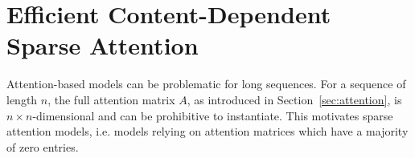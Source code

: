 \documentclass[a4paper]{article}
\begin{document}
\begin{comment}
\section{Sparse Attention as an Integer Programming Problem}
The sparse attention problem with an attention budget of \(k\)
can be formulated as an integer programming problem as follows.
Define the \(n \times n\) matrix \(X\) as \(X_{ij} = 1\) if 
position \(i\) attends to position \(j\) and \(X_{ij} = 0\)
otherwise. Then the sparse attention function can be written as:
\begin{align}
    \operatorname{Attention}(Q_i, K_j, V_j) &= \sum_{j \in [n]} 
    X_{ij} \cdot \left(\frac{\operatorname{exp} Q_i^\top K_j }{
    \sqrt{d}\sum_{i \in [n]} \operatorname{exp} Q_i^\top K_j}\right)V_j. \\
    &= X_i^\top A_i
\end{align}
This defines the full \(n \times n\) 
attention matrix sparsified using \(X\) as 
\(X^\top A\). The final objective function of maximizing log 
likelihood using
the attention function is subject to the sparse attention constraint 
\(\sum_{j \in [n]} X_{ij} = k\) and \(X_{ij} \in \{0, 1\}\). This
turns the final problem into a constrained integer programming problem,
solving which exactly is NP-hard.
 
This motivates the use of \(k\)-means clustering
as a tractable approximation
to this NP-hard problem. Similar approaches using LP relaxations
have been used in \(k\)-means and \(k\)-median clustering (see
e.g., \cite{charikar2002constant, awasthi2015relax}.
\end{comment}

\section{Efficient Content-Dependent Sparse Attention}\label{sec:ksparse}
Attention-based models can be problematic for long sequences. For a sequence of 
length $n$, the full attention matrix $A$, as introduced in Section~\ref{sec:attention}, 
is \(n \times n\)-dimensional and can be prohibitive to instantiate. 
This motivates sparse attention models, i.e. models relying on attention matrices
which have a majority of zero entries. 
\end{document}
